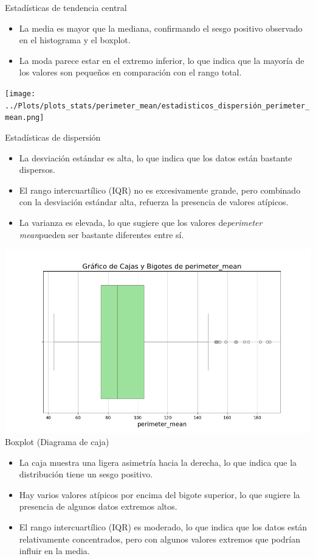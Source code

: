 \documentclass[a4paper, 12pt]{article}
\begin{document}
Estadísticas de tendencia central

\begin{itemize}
\item La media es mayor que la mediana, confirmando el sesgo positivo observado en el histograma y el boxplot.
\item La moda parece estar en el extremo inferior, lo que indica que la mayoría de los valores son pequeños en comparación con el rango total.
\end{itemize}


\texttt{[image: ../Plots/plots\_stats/perimeter\_mean/estadisticos\_dispersión\_perimeter\_mean.png]}

Estadísticas de dispersión

\begin{itemize}
\item La desviación estándar es alta, lo que indica que los datos están bastante dispersos.
\item El rango intercuartílico (IQR) no es excesivamente grande, pero combinado con la desviación estándar alta, refuerza la presencia de valores atípicos.
\item La varianza es elevada, lo que sugiere que los valores de\textit{perimeter mean}pueden ser bastante diferentes entre sí.
\end{itemize}


\includegraphics[width=\textwidth]{../Plots/plots_stats/perimeter_mean/boxplot_perimeter_mean.png}
Boxplot (Diagrama de caja)

\begin{itemize}
\item La caja muestra una ligera asimetría hacia la derecha, lo que indica que la distribución tiene un sesgo positivo.
\item Hay varios valores atípicos por encima del bigote superior, lo que sugiere la presencia de algunos datos extremos altos.
\item El rango intercuartílico (IQR) es moderado, lo que indica que los datos están relativamente concentrados, pero con algunos valores extremos que podrían influir en la media.
\end{itemize}
\end{document}
